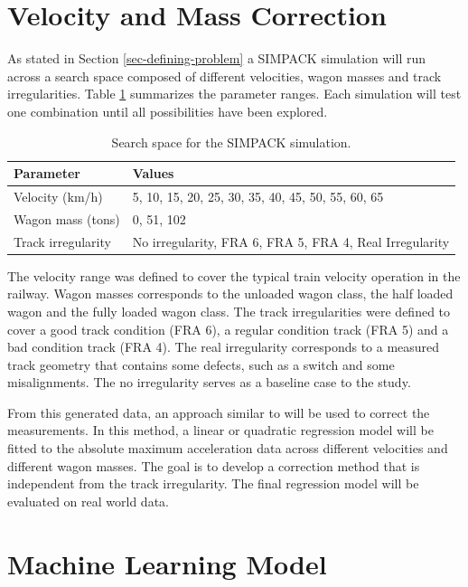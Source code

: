 \section{Velocity and Mass Correction} \label{sec-vel-mass-correction}

As stated in Section \ref{sec-defining-problem} a SIMPACK simulation will run across a search space composed of different velocities, wagon masses and track irregularities. Table \ref{table:search_space} summarizes the parameter ranges. Each simulation will test one combination until all possibilities have been explored.

\begin{table}[H]
\centering
\begin{tabular}{l l}
\hline
\textbf{Parameter} & \textbf{Values} \\
\hline
Velocity (km/h) & 5, 10, 15, 20, 25, 30, 35, 40, 45, 50, 55, 60, 65 \\
Wagon mass (tons) & 0, 51, 102 \\
Track irregularity & No irregularity, FRA 6, FRA 5, FRA 4, Real Irregularity \\
\hline
\end{tabular}
\caption{Search space for the SIMPACK simulation.}
\label{table:search_space}
\end{table}

The velocity range was defined to cover the typical train velocity operation in the railway. Wagon masses corresponds to the unloaded wagon class, the half loaded wagon and the fully loaded wagon class. The track irregularities were defined to cover a good track condition (FRA 6), a regular condition track (FRA 5) and a bad condition track (FRA 4). The real irregularity corresponds to a measured track geometry that contains some defects, such as a switch and some misalignments. The no irregularity serves as a baseline case to the study.

From this generated data, an approach similar to \cite{Balouchi02092021} will be used to correct the measurements. In this method, a linear or quadratic regression model will be fitted to the absolute maximum acceleration data across different velocities and different wagon masses. The goal is to develop a correction method that is independent from the track irregularity. The final regression model will be evaluated on real world data.

\section{Machine Learning Model} \label{sec-ml-model}

